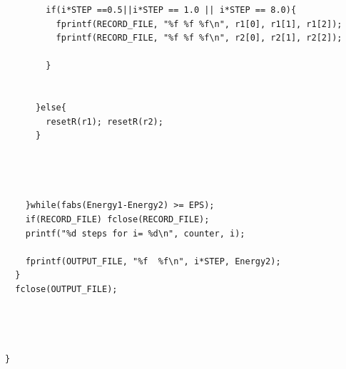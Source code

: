 \documentclass{article}
\begin{document}
\begin{verbatim}
        if(i*STEP ==0.5||i*STEP == 1.0 || i*STEP == 8.0){
          fprintf(RECORD_FILE, "%f %f %f\n", r1[0], r1[1], r1[2]);
          fprintf(RECORD_FILE, "%f %f %f\n", r2[0], r2[1], r2[2]);

        }


      }else{
        resetR(r1); resetR(r2);
      }




    }while(fabs(Energy1-Energy2) >= EPS);
    if(RECORD_FILE) fclose(RECORD_FILE);
    printf("%d steps for i= %d\n", counter, i);

    fprintf(OUTPUT_FILE, "%f  %f\n", i*STEP, Energy2);
  }
  fclose(OUTPUT_FILE);




}
\end{verbatim}

\hline
\end{document}
